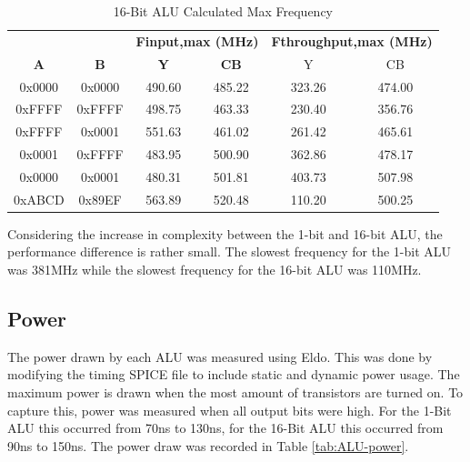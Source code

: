 \documentclass[11pt]{article}
\begin{document}
			\begin{table}[H]
				\centering
				\caption{16-Bit ALU Calculated Max Frequency}
				\label{tab:ALU-16-Bit-Freq}
				\begin{tabular}{|cc|cc|cc|}
					\hline
					\multicolumn{1}{|c}{\textbf{}}  & \multicolumn{1}{c}{\textbf{}}  & \multicolumn{2}{|c|}{\textbf{Finput,max (MHz)}} & \multicolumn{2}{c|}{\textbf{Fthroughput,max (MHz)}} \\
					\textbf{A} & \textbf{B} & \textbf{Y}            & \textbf{CB}           & Y                        & CB                      \\
					\hline
					0x0000     & 0x0000     & 490.60                & 485.22                & 323.26                   & 474.00                  \\
					0xFFFF                         & 0xFFFF                         & 498.75                & 463.33                & 230.40                   & 356.76                  \\
					0xFFFF                         & 0x0001                         & 551.63                & 461.02                & 261.42                   & 465.61                  \\
					0x0001                         & 0xFFFF                         & 483.95                & 500.90                & 362.86                   & 478.17                  \\
					0x0000                         & 0x0001                         & 480.31                & 501.81                & 403.73                   & 507.98                  \\
					0xABCD                         & 0x89EF                         & 563.89                & 520.48                & 110.20                   & 500.25                 \\
					\hline
				\end{tabular}
			\end{table}
		
			Considering the increase in complexity between the 1-bit and 16-bit ALU, the performance difference is  rather small. The slowest frequency for the 1-bit ALU was 381MHz while the slowest frequency for the 16-bit ALU was 110MHz.
	
	\subsection{Power}
	
		The power drawn by each ALU was measured using Eldo. This was done by modifying the timing SPICE file to include static and dynamic power usage. The maximum power is drawn when the most amount of transistors are turned on. To capture this, power was measured when all output bits were high. For the 1-Bit ALU this occurred from 70ns to 130ns, for the 16-Bit ALU this occurred from 90ns to 150ns. The power draw was recorded in Table \ref{tab:ALU-power}.
	
\end{document}
